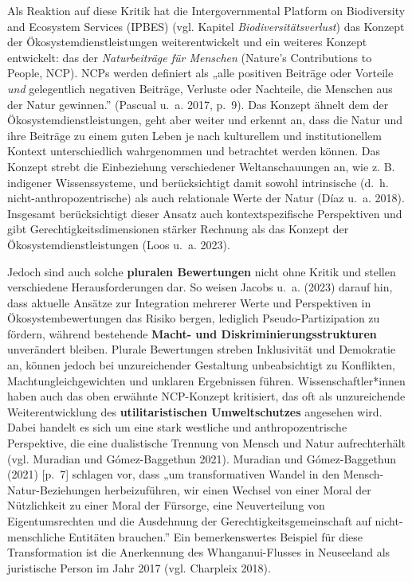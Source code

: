 \documentclass[
  nswissgerman,
  a4paper,
  openany]{book}
\begin{document}
Als Reaktion auf diese Kritik hat die Intergovernmental Platform on
Biodiversity and Ecosystem Services (IPBES) (vgl. Kapitel
\emph{Biodiversitätsverlust}) das Konzept der Ökosystemdienstleistungen
weiterentwickelt und ein weiteres Konzept entwickelt: das der
\emph{Naturbeiträge für Menschen} (Nature's Contributions to People,
NCP). NCPs werden definiert als „alle positiven Beiträge oder Vorteile
\emph{und} gelegentlich negativen Beiträge, Verluste oder Nachteile, die
Menschen aus der Natur gewinnen.'' ({Pascual u.~a.} 2017, p.~9). Das
Konzept ähnelt dem der Ökosystemdienstleistungen, geht aber weiter und
erkennt an, dass die Natur und ihre Beiträge zu einem guten Leben je
nach kulturellem und institutionellem Kontext unterschiedlich
wahrgenommen und betrachtet werden können. Das Konzept strebt die
Einbeziehung verschiedener Weltanschauungen an, wie z. B. indigener
Wissenssysteme, und berücksichtigt damit sowohl intrinsische (d.~h.
nicht-anthropozentrische) als auch relationale Werte der Natur ({Díaz
u.~a.} 2018). Insgesamt berücksichtigt dieser Ansatz auch
kontextspezifische Perspektiven und gibt Gerechtigkeitsdimensionen
stärker Rechnung als das Konzept der Ökosystemdienstleistungen (Loos
u.~a. 2023).

Jedoch sind auch solche \textbf{pluralen Bewertungen} nicht ohne Kritik
und stellen verschiedene Herausforderungen dar. So weisen Jacobs u.~a.
(2023) darauf hin, dass aktuelle Ansätze zur Integration mehrerer Werte
und Perspektiven in Ökosystembewertungen das Risiko bergen, lediglich
Pseudo-Partizipation zu fördern, während bestehende \textbf{Macht- und
Diskriminierungsstrukturen} unverändert bleiben. Plurale Bewertungen
streben Inklusivität und Demokratie an, können jedoch bei unzureichender
Gestaltung unbeabsichtigt zu Konflikten, Machtungleichgewichten und
unklaren Ergebnissen führen. Wissenschaftler*innen haben auch das oben
erwähnte NCP-Konzept kritisiert, das oft als unzureichende
Weiterentwicklung des \textbf{utilitaristischen Umweltschutzes}
angesehen wird. Dabei handelt es sich um eine stark westliche und
anthropozentrische Perspektive, die eine dualistische Trennung von
Mensch und Natur aufrechterhält (vgl. Muradian und Gómez-Baggethun
2021). Muradian und Gómez-Baggethun (2021) {[}p.~7{]} schlagen vor, dass
„um transformativen Wandel in den Mensch-Natur-Beziehungen
herbeizuführen, wir einen Wechsel von einer Moral der Nützlichkeit zu
einer Moral der Fürsorge, eine Neuverteilung von Eigentumsrechten und
die Ausdehnung der Gerechtigkeitsgemeinschaft auf nicht-menschliche
Entitäten brauchen.'' Ein bemerkenswertes Beispiel für diese
Transformation ist die Anerkennung des Whanganui-Flusses in Neuseeland
als juristische Person im Jahr 2017 (vgl. Charpleix 2018).
\end{document}
